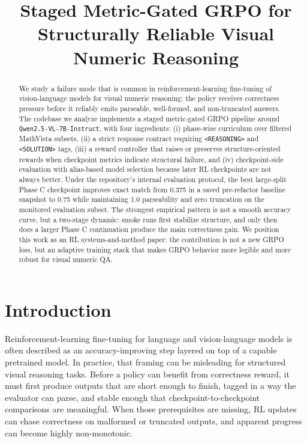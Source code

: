 \documentclass{article} %
\title{Staged Metric-Gated GRPO for Structurally Reliable Visual Numeric Reasoning}
\author{}
\begin{document}
\maketitle

\begin{abstract}
We study a failure mode that is common in reinforcement-learning fine-tuning of vision-language models for visual numeric reasoning: the policy receives correctness pressure before it reliably emits parseable, well-formed, and non-truncated answers. The codebase we analyze implements a staged metric-gated GRPO pipeline around \texttt{Qwen2.5-VL-7B-Instruct}, with four ingredients: (i) phase-wise curriculum over filtered MathVista subsets, (ii) a strict response contract requiring \texttt{<REASONING>} and \texttt{<SOLUTION>} tags, (iii) a reward controller that raises or preserves structure-oriented rewards when checkpoint metrics indicate structural failure, and (iv) checkpoint-side evaluation with alias-based model selection because later RL checkpoints are not always better. Under the repository's internal evaluation protocol, the best large-split Phase C checkpoint improves exact match from 0.375 in a saved pre-refactor baseline snapshot to 0.75 while maintaining 1.0 parseability and zero truncation on the monitored evaluation subset. The strongest empirical pattern is not a smooth accuracy curve, but a two-stage dynamic: smoke runs first stabilize structure, and only then does a larger Phase C continuation produce the main correctness gain. We position this work as an RL systems-and-method paper: the contribution is not a new GRPO loss, but an adaptive training stack that makes GRPO behavior more legible and more robust for visual numeric QA.
\end{abstract}

\section{Introduction}

Reinforcement-learning fine-tuning for language and vision-language models is often described as an accuracy-improving step layered on top of a capable pretrained model. In practice, that framing can be misleading for structured visual reasoning tasks. Before a policy can benefit from correctness reward, it must first produce outputs that are short enough to finish, tagged in a way the evaluator can parse, and stable enough that checkpoint-to-checkpoint comparisons are meaningful. When those prerequisites are missing, RL updates can chase correctness on malformed or truncated outputs, and apparent progress can become highly non-monotonic.
\end{document}
